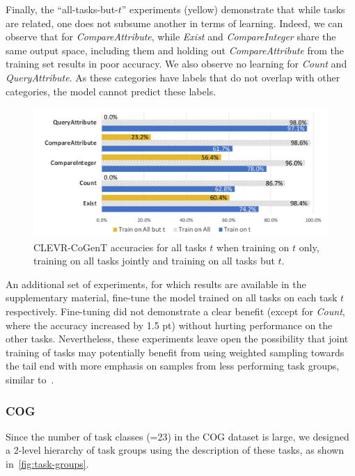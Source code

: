 Finally, the ``all-tasks-but-$t$'' experiments (yellow) demonstrate that while tasks are related, one does not subsume another in terms of learning. Indeed, we can observe that for \textit{CompareAttribute}, while \textit{Exist} and \textit{CompareInteger} share the same output space, including them and holding out \textit{CompareAttribute} from the training set results in poor accuracy.
We also observe no learning for \textit{Count} and \textit{QueryAttribute}. As these categories have labels that do not overlap with other categories, the model cannot predict these labels.


\begin{figure}[!t]
	\centering
	\includegraphics[width=\columnwidth]{img/results/CoGenT_results.pdf}
	\caption{CLEVR-CoGenT accuracies for all tasks $t$ when training on $t$ only, training on all tasks jointly and training on all tasks but $t$.} %
	\label{fig:CoGenT-results}
\end{figure}

An additional set of experiments, for which results are available in the supplementary material,
fine-tune the model trained on all tasks on each task $t$ respectively.
Fine-tuning did not demonstrate a clear benefit (except for \textit{Count}, where the accuracy increased by 1.5 pt) without hurting performance on the other tasks. Nevertheless, these experiments leave open the possibility that joint training of tasks may potentially benefit from using weighted sampling towards the tail end with more emphasis on samples from less performing task groups, similar to~\cite{guo2018dynamic, kendall2018multi}.

\subsubsection{COG}
\label{sec:reasoning-cog}
Since the number of task classes (=23) in the COG dataset is large, we designed a 2-level hierarchy of task groups using the
description of these tasks, as shown in~\cref{fig:task-groups}.

